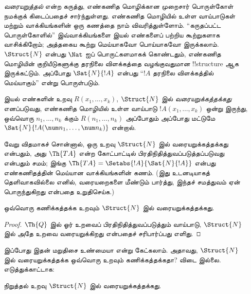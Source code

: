 \documentclass[../../../include/open-logic-section]{subfiles}
\begin{document}



\emph{வரையறுத்தல்} என்ற கருத்து, எண்கணித மொழிக்கான முறைசார்
பொருள்கோள் நமக்குக் கிடைப்பதைச் சார்ந்துள்ளது. எண்கணித மொழியில்
உள்ள வாய்பாடுகள் மற்றும் வாக்கியங்களின் ஒரு கணத்தை நாம்
விவரித்துள்ளோம். “கருதப்பட்ட பொருள்கோளில்” இவ்வாக்கியங்களை இயல்
எண்களைப் பற்றிய கூற்றுகளாக வாசிக்கிறோம்; அத்தகைய கூற்று
மெய்யாகவோ பொய்யாகவோ இருக்கலாம். $\Struct{N}$ என்பது
$\Nat$ ஐப் பொருட்களமாகக் கொண்டதும், எண்கணித மொழியின் குறியீடுகளுக்கு
தரநிலை விளக்கத்தை வழங்குவதுமான !!{structure} ஆக இருக்கட்டும்.
அப்போது $\Sat{N}{!A}$ என்பது “$!A$ தரநிலை விளக்கத்தில் மெய்யாகும்”
என்று பொருள்படும்.

\begin{defn}
இயல் எண்களின் உறவு
$R(x_1,\dots,x_k)$, $\Struct{N}$ இல் \emph{வரையறுக்கத்தக்கது}
எனப்படுவது, எண்கணித மொழியில் உள்ள வாய்பாடு
$!A(x_1,\dots,x_k)$ ஒன்று இருந்து, ஒவ்வொரு
$n_1,\dots,n_k$ க்கும்
$R(n_1,\dots,n_k)$ அப்போதும் அப்போது மட்டுமே
$\Sat{N}{!A(\num n_1,\dots,\num n_k)}$ என்றால்.
\end{defn}

வேறு விதமாகச் சொன்னால், ஒரு உறவு $\Struct{N}$ இல்
வரையறுக்கத்தக்கது என்பதும், அது $\Th{TA}$ என்ற கோட்பாட்டில்
பிரதிநிதித்துவப்படுத்தப்படுவது என்பதும் சமம்; இங்கு
$\Th{TA} = \Setabs{!A}{\Sat{N}{!A}}$ என்பது எண்கணிதத்தின்
மெய்யான வாக்கியங்களின் கணம். (இது உடனடியாகத் தெளிவாகவில்லை எனில்,
வரையறைகளை மீண்டும் பார்த்து, இந்தச் சமத்துவம் ஏன் பொருந்துகிறது
என்பதை உறுதிசெய்க.)

\begin{lem}
ஒவ்வொரு கணிக்கத்தக்க உறவும் $\Struct{N}$ இல் வரையறுக்கத்தக்கது.
\end{lem}

\begin{proof}
$\Th{Q}$ இல் ஓர் உறவைப் பிரதிநிதித்துவப்படுத்தும் வாய்பாடு,
$\Struct{N}$ இல் அதே உறவை வரையறுக்கிறது என்பதைச் சரிபார்ப்பது
எளிது.
\end{proof}

இப்போது இதன் மறுதிசை உண்மையா என்று கேட்கலாம். அதாவது,
$\Struct{N}$ இல் வரையறுக்கத்தக்க ஒவ்வொரு உறவும் கணிக்கத்தக்கதா?
விடை இல்லை. எடுத்துக்காட்டாக:

\begin{lem}
நிறுத்தல் உறவு $\Struct{N}$ இல் வரையறுக்கத்தக்கது.
\end{lem}
\end{document}
